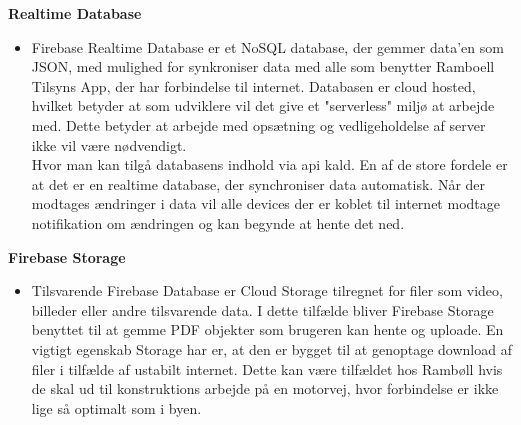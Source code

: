 \textbf{Realtime Database\cite{FirebaseRealtimeDB}}
\begin{itemize}[-]
	\itemsep 0.3em 
	\item[]  Firebase Realtime Database er et NoSQL database, der gemmer data'en som JSON\cite{JSON}, med mulighed for synkroniser data med alle som benytter Ramboell Tilsyns App, der har forbindelse til internet. Databasen er cloud hosted, hvilket betyder at som udviklere vil det give et "serverless" miljø at arbejde med. Dette betyder at arbejde med opsætning og vedligeholdelse af server ikke vil være nødvendigt. \\ Hvor man kan tilgå databasens indhold via api kald. 
	En af de store fordele er at det er en realtime database, der synchroniser data automatisk. Når der modtages ændringer i data vil alle devices der er koblet til internet modtage notifikation om ændringen og kan begynde at hente det ned. 
\end{itemize}

\textbf{Firebase Storage\cite{FirebaseStorage}}
\begin{itemize}[-]
	\itemsep 0.3em 
	\item[] Tilsvarende Firebase Database er Cloud Storage tilregnet for filer som video, billeder eller andre tilsvarende data. I dette tilfælde bliver Firebase Storage benyttet til at gemme PDF objekter som brugeren kan hente og uploade. En vigtigt egenskab Storage har er, at den er bygget til at genoptage download af filer i tilfælde af ustabilt internet. Dette kan være tilfældet hos Rambøll hvis de skal ud til konstruktions arbejde på en motorvej, hvor forbindelse er ikke lige så optimalt som i byen. \\
\end{itemize}
\clearpage

